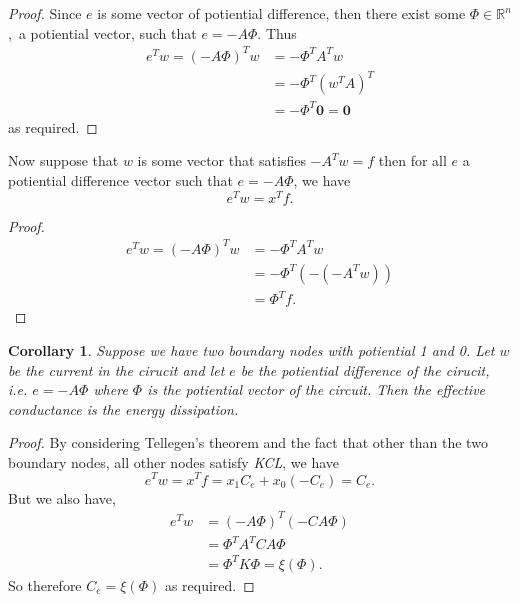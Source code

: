 \documentclass[]{article}
\newtheorem{corollary}{Corollary}[theorem]
\begin{document}
\begin{proof}
Since $e$ is some vector of potiential difference, then there exist some $\Phi \in \mathbb{R}^n$, a potiential 
vector, such that $e = -A\Phi$. Thus
\begin{align*}
e^T w = (- A\Phi)^T w & = - \Phi^T A^T w \\
& = - \Phi^T (w^T A)^T\\
& = - \Phi^T \mathbf{0} = \mathbf{0}
\end{align*}
as required.
\end{proof}

Now suppose that \(w\) is some vector that satisfies \(-A^T w = f\) then
for all \(e\) a potiential difference vector such that \(e = -A\Phi\),
we have \[
e^T w = x^T f.
\]

\begin{proof}
\begin{align*}
e^T w = (- A\Phi)^T w &= - \Phi^T A^T w \\
& = - \Phi^T (- (- A^T w))\\
& = \Phi^T f. 
\end{align*}
\end{proof}

\begin{corollary}
Suppose we have two boundary nodes with potiential 1 and 0. Let $w$ be the current in the cirucit 
and let $e$ be the potiential difference of the cirucit, i.e. $e = -A\Phi$ where $\Phi$ is the potiential 
vector of the circuit. Then the effective conductance is the energy dissipation.
\end{corollary}

\begin{proof}
By considering Tellegen's theorem and the fact that other than the two boundary nodes, all other nodes 
satisfy \textit{KCL}, we have
$$
e^T w = x^T f = x_1 C_e + x_0 (-C_e) = C_e.
$$
But we also have, 
\begin{align*}
e^T w & = (-A\Phi)^T(-CA\Phi)\\
& = \Phi^T A^T CA\Phi\\
& = \Phi^T K \Phi = \xi(\Phi).
\end{align*}
So therefore $C_e = \xi(\Phi)$ as required.
\end{proof}
\end{document}
